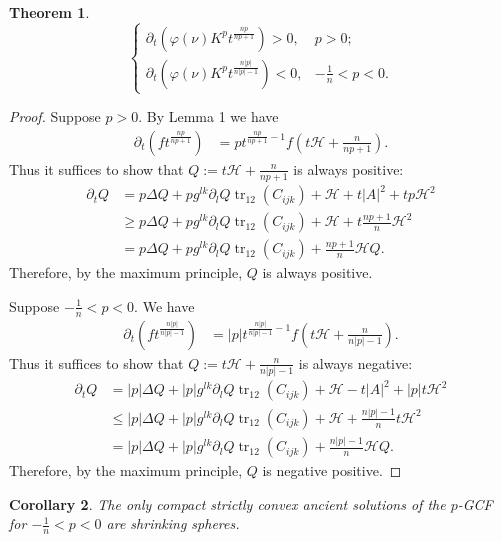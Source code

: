 \documentclass{amsart}
\newtheorem{theorem}{Theorem}
\newtheorem{corollary}[theorem]{Corollary}
\theoremstyle{definition}
\theoremstyle{remark}
\numberwithin{equation}{section}
\begin{document}
\begin{theorem}
\[\left\{
  \begin{array}{ll}
    \partial_t \left(\varphi(\nu)K^pt^{\frac{n p }{n p +1}}\right)> 0, & p>0; \\
    \partial_t \left(\varphi(\nu)K^pt^{\frac{n |p| }{n |p| -1}}\right)<0, & -\frac{1}{n}<p<0.
  \end{array}
\right.
\]
\end{theorem}
\begin{proof}
Suppose $p>0.$
By Lemma 1 we have
\begin{align*}
\partial_t \left(ft^{\frac{n p }{n p +1}}\right)&= p  t^{\frac{n p }{n p +1}-1}f\left(t\mathcal{H}+\frac{n}{n p +1}\right).
\end{align*}
Thus it suffices to show that $Q:=t\mathcal{H}+\frac{n}{n p +1}$ is always positive:
\begin{align*}
\partial_t Q&= p\Delta Q+ p  g^{lk}\partial_lQ \operatorname{tr}_{12}( C _{ijk})+\mathcal{H}+t| A |^2+  tp \mathcal{H}^2\\
&\geq  p \Delta Q+ p  g^{lk}\partial_lQ \operatorname{tr}_{12}( C _{ijk})+\mathcal{H}+t\frac{n p +1}{n} \mathcal{H}^2\\
&= p \Delta Q+ p  g^{lk}\partial_lQ \operatorname{tr}_{12}( C _{ijk})+\frac{n p +1}{n}\mathcal{H}Q.
\end{align*}
Therefore, by the maximum principle, $Q$ is always positive.


Suppose $-\frac{1}{n}<p<0.$ We have
\begin{align*}
\partial_t \left(ft^{\frac{n |p| }{n |p| -1}}\right)&= |p|  t^{\frac{n |p| }{n |p| -1}-1}f\left(t\mathcal{H}+\frac{n}{n |p| -1}\right).
\end{align*}
Thus it suffices to show that $Q:=t\mathcal{H}+\frac{n}{n |p| -1}$ is always negative:
\begin{align*}
\partial_t Q&= |p| \Delta Q+ |p|  g^{lk}\partial_lQ \operatorname{tr}_{12}( C _{ijk})+\mathcal{H}-t| A |^2+ |p|  t \mathcal{H}^2\\
&\leq  |p| \Delta Q+ |p|  g^{lk}\partial_lQ \operatorname{tr}_{12}( C _{ijk})+\mathcal{H}+\frac{n |p| -1}{n}t \mathcal{H}^2\\
&= |p| \Delta Q+ |p|  g^{lk}\partial_lQ \operatorname{tr}_{12}( C _{ijk})+\frac{n |p| -1}{n}\mathcal{H}Q.
\end{align*}
Therefore, by the maximum principle, $Q$ is negative positive.
\end{proof}
\begin{corollary}
The only compact strictly convex ancient solutions of the $p$-GCF for $-\frac{1}{n}<p<0$ are shrinking spheres.
\end{corollary}
\end{document}
